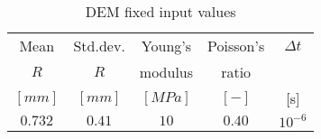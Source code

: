 \begin{table}[h]
\centering
\begin{tabular}{ccccc}
\hline
    Mean & Std.dev.  & Young's & Poisson's & $\Delta t$\\
    $R$ & $R$ & modulus & ratio & \\
    $[mm]$  & $[mm]$  & $[MPa]$ & $[-]$ & [s]\\
    \hline
    $0.732$ & $0.41$ & $10$    & $0.40$ & $10^{-6}$\\


\hline
\end{tabular}
\caption{DEM fixed input values}
\label{tab:09DEMFixedinputvalues}
\end{table}